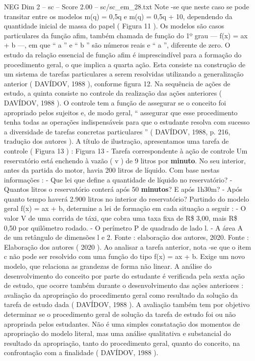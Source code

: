 \begin{textsample}{NEG Dim 2 – sc – Score 2.00 – sc/sc\_em\_28.txt}
Note -se que neste caso se pode transitar entre os modelos m(q) = 0,5q e m(q) = 0,5q + 10, dependendo da quantidade inicial de massa do papel ( Figura 11 ).
Os modelos são casos particulares da função afim, também chamada de função do 1º grau — f(x) = ax + b —, em que “ a ” e “ b ” são números reais e “ a ”, diferente de zero.
O estudo da relação essencial de função afim é imprescindível para a formação do procedimento geral, o que implica a quarta ação.
Esta consiste na construção de um sistema de tarefas particulares a serem resolvidas utilizando a generalização anterior ( DAVÍDOV, 1988 ), conforme figura 12.
Na sequência de ações de estudo, a quinta consiste no controle da realização das ações anteriores ( DAVÍDOV, 1988 ).
O controle tem a função de assegurar se o conceito foi apropriado pelos sujeitos e, de modo geral, “ assegurar que esse procedimento tenha todas as operações indispensáveis para que o estudante resolva com sucesso a diversidade de tarefas concretas particulares ” ( DAVÍDOV, 1988, p. 216, tradução dos autores ).
A título de ilustração, apresentamos uma tarefa de controle ( Figura 13 ) : Figura 13 - Tarefa correspondente à ação de controle Um reservatório está enchendo à vazão ( v ) de 9 litros por \textbf{minuto}.
No seu interior, antes da partida do motor, havia 200 litros de líquido.
Com base nestas informações : - Que lei que define a quantidade de líquido no reservatório? - Quantos litros o reservatório conterá após 50 \textbf{minutos}?
E após 1h30m? - Após quanto tempo haverá 2.900 litros no interior do reservatório?
Partindo do modelo geral f(x) = ax + b, determine a lei de formação em cada situação a seguir : - O valor V de uma corrida de táxi, que cobra uma taxa fixa de R\$ 3,00, mais R\$ 0,50 por quilômetro rodado. - O perímetro P de quadrado de lado l. - A área A de um retângulo de dimensões l e 2.
Fonte : elaboração dos autores, 2020.
Fonte : Elaboração dos autores ( 2020 ).
Ao analisar a tarefa anterior, nota -se que o item c não pode ser resolvido com uma função do tipo f(x) = ax + b.
Exige um novo modelo, que relaciona as grandezas de forma não linear.
A análise do desenvolvimento do conceito por parte do estudante é verificada pela sexta ação de estudo, que ocorre também durante o desenvolvimento das ações anteriores : avaliação da apropriação do procedimento geral como resultado da solução da tarefa de estudo dada ( DAVÍDOV, 1988 ).
A avaliação também tem por objetivo determinar se o procedimento geral de solução da tarefa de estudo foi ou não apropriada pelos estudantes.
Não é uma simples constatação dos momentos de apropriação do modelo literal, mas uma análise qualitativa e substancial do resultado da apropriação, tanto do procedimento geral, quanto do conceito, na confrontação com a finalidade ( DAVÍDOV, 1988 ).

\end{textsample}
